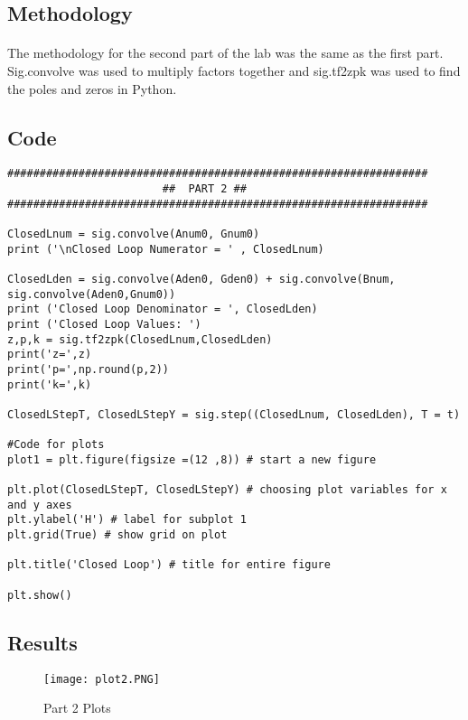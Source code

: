 \subsection{Methodology}

\paragraph{}
The methodology for the second part of the lab was the same as the first part.  Sig.convolve was used to multiply factors together and sig.tf2zpk was used to find the poles and zeros in Python.

\subsection{Code}
\begin{scriptsize}
\begin{lstlisting}
#################################################################
                        ##  PART 2 ##
#################################################################

ClosedLnum = sig.convolve(Anum0, Gnum0)
print ('\nClosed Loop Numerator = ' , ClosedLnum)

ClosedLden = sig.convolve(Aden0, Gden0) + sig.convolve(Bnum, sig.convolve(Aden0,Gnum0))
print ('Closed Loop Denominator = ', ClosedLden)
print ('Closed Loop Values: ')
z,p,k = sig.tf2zpk(ClosedLnum,ClosedLden)
print('z=',z)
print('p=',np.round(p,2))
print('k=',k)

ClosedLStepT, ClosedLStepY = sig.step((ClosedLnum, ClosedLden), T = t)

#Code for plots
plot1 = plt.figure(figsize =(12 ,8)) # start a new figure

plt.plot(ClosedLStepT, ClosedLStepY) # choosing plot variables for x and y axes
plt.ylabel('H') # label for subplot 1
plt.grid(True) # show grid on plot

plt.title('Closed Loop') # title for entire figure 

plt.show()

\end{lstlisting}
\end{scriptsize}

\subsection{Results}


 \begin{figure}[H]
	   \centering
	   \texttt{[image: plot2.PNG]}
	   \caption{Part 2 Plots}
 \end{figure}
